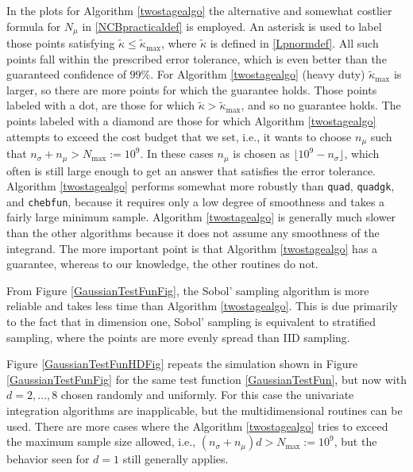 \documentclass[graybox]{svmult}
\newcommand{\tkappa}{\tilde{\kappa}}
\begin{document}
In the plots for Algorithm \ref{twostagealgo} the alternative and somewhat costlier formula for $N_{\mu}$ in \eqref{NCBpracticaldef} is employed. An asterisk is used to label those points satisfying $\tkappa \le \tkappa_{\max}$, where $\tkappa$ is defined in \eqref{Lpnormdef}. All such points fall within the prescribed error tolerance,
which is even better than the guaranteed confidence of $99\%$.  
For Algorithm \ref{twostagealgo} (heavy duty) $\tkappa_{\max}$ is larger, so there are more points for which the guarantee holds.  Those points labeled with a dot, are those for which $\tkappa > \tkappa_{\max}$, and so no guarantee holds. The points labeled with a diamond are those for which Algorithm \ref{twostagealgo} attempts to exceed the cost budget that we set, i.e., it wants to choose $n_\mu$ such that $n_{\sigma}+n_\mu > N_{\max}:=10^9$. In these cases $n_\mu$ is chosen as $\lfloor 10^9 - n_\sigma \rfloor$, which often is still large enough to get an answer that satisfies the error tolerance. 
Algorithm \ref{twostagealgo} performs somewhat more robustly than {\tt quad}, {\tt quadgk}, and {\tt chebfun}, because it requires only a low degree of smoothness and takes a fairly large minimum sample. Algorithm \ref{twostagealgo} is generally much slower than the other algorithms because it does not assume any smoothness of the integrand. The more important point is that Algorithm \ref{twostagealgo} has a guarantee, whereas to our knowledge, the other routines do not.

From Figure \ref{GaussianTestFunFig}, the Sobol' sampling algorithm is more reliable and takes less time than Algorithm \ref{twostagealgo}.  This is due primarily to the fact that in dimension one, Sobol' sampling is equivalent to stratified sampling, where the points are more evenly spread than IID sampling.

Figure \ref{GaussianTestFunHDFig} repeats the simulation shown in Figure \ref{GaussianTestFunFig} for the same test function \eqref{GaussianTestFun}, but now with $d=2, \ldots, 8$ chosen randomly and uniformly.  For this case the univariate integration algorithms are inapplicable, but the multidimensional routines can be used.  There are more cases where the Algorithm \ref{twostagealgo} tries to exceed the maximum sample size allowed, i.e., $(n_{\sigma}+n_\mu)d > N_{\max}:=10^9$, but the behavior seen for $d=1$ still generally applies.  
\end{document}
